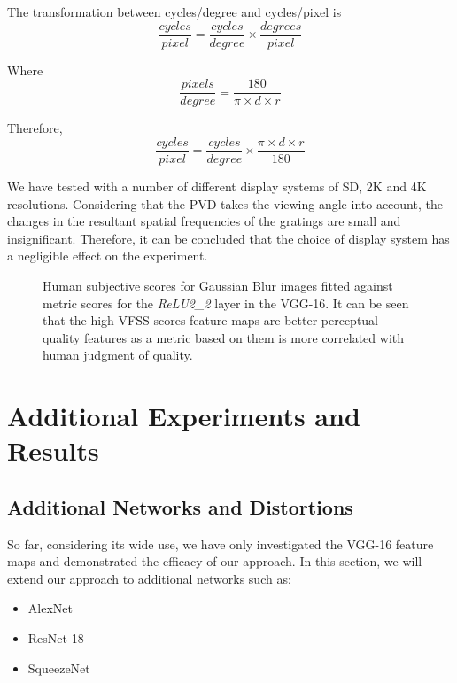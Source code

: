 \documentclass[10pt,twocolumn,letterpaper]{article}
\begin{document}
The transformation between cycles/degree and cycles/pixel is
\begin{equation}
   \frac{cycles}{pixel} = \frac{cycles}{degree} \times \frac{degrees}{pixel}
\end{equation}

Where
\begin{equation}
   \frac{pixels}{degree} = \frac{180}{\pi \times d \times r}
\end{equation}

Therefore,
\begin{equation}
   \frac{cycles}{pixel} = \frac{cycles}{degree} \times \frac{\pi \times d \times r}{180}
\end{equation}

We have tested with a number of different display systems of SD, 2K and 4K resolutions. Considering that the PVD takes the viewing angle into account, the changes in the resultant spatial frequencies of the gratings are small and insignificant. Therefore, it can be concluded that the choice of display system has a negligible effect on the experiment.

\begin{figure}[bt!]

  \hfill
  \caption{Human subjective scores for Gaussian Blur images fitted against metric scores for the \textit{ReLU2\_2} layer in the VGG-16. It can be seen that the high VFSS scores feature maps are better perceptual quality features as a metric based on them is more correlated with human judgment of quality. }
\end{figure}

\section{Additional Experiments and Results}
\subsection{Additional Networks and Distortions}
So far, considering its wide use, we have only investigated the VGG-16 feature maps and demonstrated the efficacy of our approach. In this section, we will extend our approach to additional networks such as;
\begin{itemize}
 \item AlexNet \cite{35}
 \item ResNet-18 \cite{33}
 \item SqueezeNet \cite{34}
\end{itemize}
\end{document}
